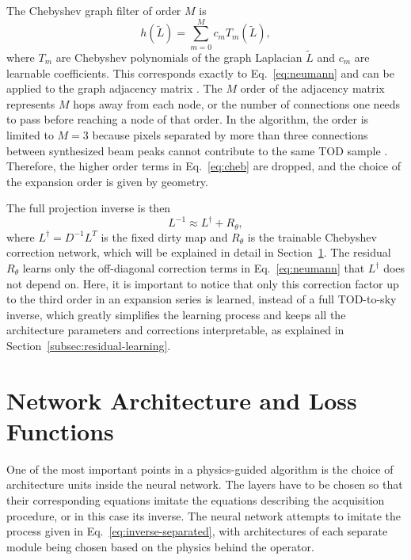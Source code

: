 \documentclass[a4paper,11pt]{article}
\begin{document}
The Chebyshev graph filter of order $M$ is
\begin{equation}
    h(\tilde{L}) = \sum_{m=0}^{M} c_m T_m(\tilde{L}),
    \label{eq:cheb}
\end{equation}
where $T_m$ are Chebyshev polynomials of the graph Laplacian $\tilde{L}$ and $c_m$ are learnable coefficients. This corresponds exactly to Eq.~\ref{eq:neumann} and can be applied to the graph adjacency matrix \cite{defferrard2016chebconv}. The $M$ order of the adjacency matrix represents $M$ hops away from each node, or the number of connections one needs to pass before reaching a node of that order. In the algorithm, the order is limited to $M = 3$ because pixels separated by more than three connections between
synthesized beam peaks cannot contribute to the same TOD sample \cite{kardum2025proceeding}. Therefore, the higher order terms in Eq.~\ref{eq:cheb} are dropped, and the choice of the expansion order is given by geometry.

The full projection inverse is then
\begin{equation}
    L^{-1} \approx L^\dagger + R_\theta,
\end{equation}
where $L^\dagger = D^{-1}L^T$ is the fixed dirty map and $R_\theta$ is the trainable Chebyshev correction network, which will be explained in detail in Section~\ref{sec:architecture-loss}. The residual $R_\theta$ learns only the off-diagonal correction terms in Eq.~\ref{eq:neumann} that $L^\dagger$ does not depend on. Here, it is important to notice that only this correction factor up to the third order in an expansion series is learned, instead of a full TOD-to-sky inverse, which greatly simplifies the learning process and keeps all the architecture parameters and corrections interpretable, as explained in Section~\ref{subsec:residual-learning}.

\section{Network Architecture and Loss Functions}
\label{sec:architecture-loss}

One of the most important points in a physics-guided algorithm is the choice of architecture units inside the neural network. The layers have to be chosen so that their corresponding equations imitate the equations describing the acquisition procedure, or in this case its inverse. The neural network attempts to imitate the process given in Eq.~\ref{eq:inverse-separated}, with architectures of each separate module being chosen based on the physics behind the operator. 
\end{document}
